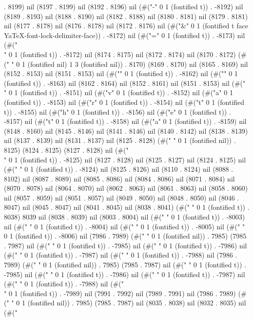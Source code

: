 . 8199) nil (8197 . 8199) nil (8192 . 8196) nil (#("-" 0 1 (fontified t)) . -8192) nil (8189 . 8193) nil (8188 . 8190) nil (8182 . 8188) nil (8180 . 8181) nil (8179 . 8181) nil (8177 . 8178) nil (8176 . 8178) nil (8172 . 8176) nil (#("&" 0 1 (fontified t face YaTeX-font-lock-delimiter-face)) . -8172) nil (#("=" 0 1 (fontified t)) . -8173) nil (#("\\" 0 1 (fontified t)) . -8172) nil (8174 . 8175) nil (8172 . 8174) nil (8170 . 8172) (#("   " 0 1 (fontified nil) 1 3 (fontified nil)) . 8170) (8169 . 8170) nil (8165 . 8169) nil (8152 . 8153) nil (8151 . 8153) nil (#("{" 0 1 (fontified t)) . -8162) nil (#("}" 0 1 (fontified t)) . -8163) nil (8162 . 8164) nil (8152 . 8161) nil (8151 . 8153) nil (#("\\" 0 1 (fontified t)) . -8151) nil (#("v" 0 1 (fontified t)) . -8152) nil (#("a" 0 1 (fontified t)) . -8153) nil (#("r" 0 1 (fontified t)) . -8154) nil (#("t" 0 1 (fontified t)) . -8155) nil (#("h" 0 1 (fontified t)) . -8156) nil (#("e" 0 1 (fontified t)) . -8157) nil (#("t" 0 1 (fontified t)) . -8158) nil (#("a" 0 1 (fontified t)) . -8159) nil (8148 . 8160) nil (8145 . 8146) nil (8141 . 8146) nil (8140 . 8142) nil (8138 . 8139) nil (8137 . 8139) nil (8131 . 8137) nil (8125 . 8128) (#(" " 0 1 (fontified nil)) . 8125) (8124 . 8125) (8127 . 8128) nil (#("\\" 0 1 (fontified t)) . -8125) nil (8127 . 8128) nil (8125 . 8127) nil (8124 . 8125) nil (#("
" 0 1 (fontified t)) . -8124) nil (8125 . 8126) nil (8110 . 8124) nil (8088 . 8102) nil (8087 . 8089) nil (8085 . 8086) nil (8084 . 8086) nil (8071 . 8084) nil (8070 . 8078) nil (8064 . 8070) nil (8062 . 8063) nil (8061 . 8063) nil (8058 . 8060) nil (8057 . 8059) nil (8051 . 8057) nil (8049 . 8050) nil (8048 . 8050) nil (8046 . 8047) nil (8045 . 8047) nil (8041 . 8045) nil (8038 . 8041) (#(" " 0 1 (fontified t)) . 8038) 8039 nil (8038 . 8039) nil (8003 . 8004) nil (#("
" 0 1 (fontified t)) . -8003) nil (#(" " 0 1 (fontified t)) . -8004) nil (#(" " 0 1 (fontified t)) . -8005) nil (#(" " 0 1 (fontified t)) . -8006) nil (7986 . 7989) (#(" " 0 1 (fontified nil)) . 7985) (7985 . 7987) nil (#("
" 0 1 (fontified t)) . -7985) nil (#(" " 0 1 (fontified t)) . -7986) nil (#(" " 0 1 (fontified t)) . -7987) nil (#(" " 0 1 (fontified t)) . -7988) nil (7986 . 7989) (#(" " 0 1 (fontified nil)) . 7985) (7985 . 7987) nil (#("
" 0 1 (fontified t)) . -7985) nil (#(" " 0 1 (fontified t)) . -7986) nil (#(" " 0 1 (fontified t)) . -7987) nil (#(" " 0 1 (fontified t)) . -7988) nil (#("\\" 0 1 (fontified t)) . -7989) nil (7991 . 7992) nil (7989 . 7991) nil (7986 . 7989) (#(" " 0 1 (fontified nil)) . 7985) (7985 . 7987) nil (8035 . 8038) nil (8032 . 8035) nil (#("
